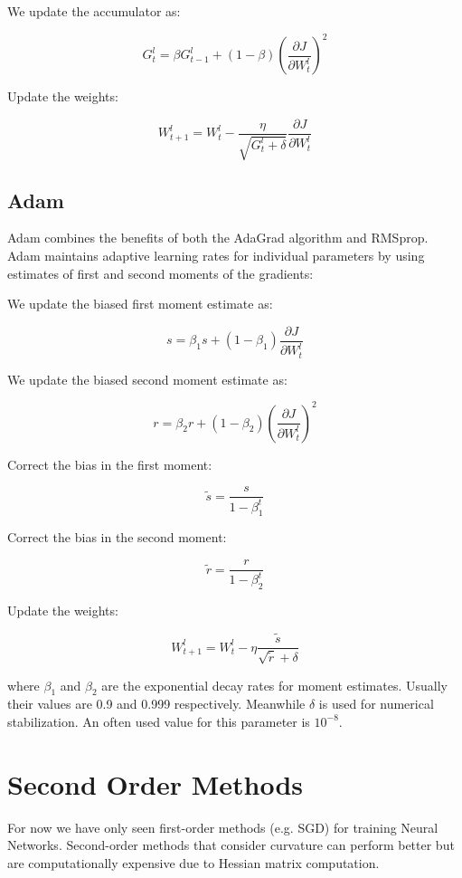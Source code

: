 \noindent We update the accumulator as:

$$ G_{t}^{l} = \beta G_{t-1}^{l} + (1 - \beta) \left( \frac{\partial J}{\partial W_{t}^{l}}  \right)^2  $$

\noindent Update the weights:

$$ W_{t+1}^{l} = W_{t}^{l} - \frac{\eta}{\sqrt{G_{t}^{l} + \delta}} \frac{\partial J}{\partial W_{t}^{l}} $$


\subsection{Adam}

Adam combines the benefits of both the AdaGrad algorithm and RMSprop. Adam maintains adaptive learning rates for individual parameters by using estimates of first and second moments of the gradients:

\noindent We update the biased first moment estimate as:

$$ s = \beta_{1}s + (1 - \beta_{1})\frac{\partial J}{\partial W_{t}^{l}} $$

\noindent We update the biased second moment estimate as:

$$ r = \beta_{2}r + (1 - \beta_{2})\left( \frac{\partial J}{\partial W_{t}^{l}}  \right)^2 $$

\noindent Correct the bias in the first moment:

$$ \tilde{s} = \frac{s}{1 - \beta_{1}^{t}} $$

\noindent Correct the bias in the second moment:

$$ \tilde{r} = \frac{r}{1 - \beta_{2}^{t}} $$

\noindent Update the weights:

$$ W_{t+1}^{l} = W_{t}^{l} -\eta \frac{\tilde{s}}{\sqrt{\tilde{r}} + \delta}   $$


where $\beta_{1}$ and $\beta_{2}$ are the exponential decay rates for moment estimates. Usually their values are 0.9 and 0.999 respectively. Meanwhile $\delta$ is used for numerical stabilization. An often used value for this parameter is $10^{-8}$.

\section{Second Order Methods}

For now we have only seen first-order methods (e.g. SGD) for training Neural Networks. Second-order methods that consider curvature can perform better but are computationally expensive due to Hessian matrix computation.

